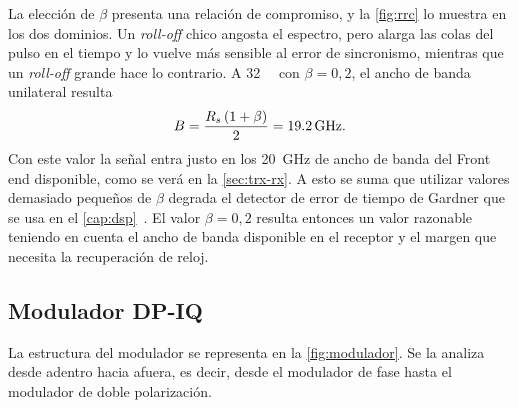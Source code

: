 La elecci\'on de $\beta$ presenta una relaci\'on de compromiso, y la
\cref{fig:rrc} lo muestra en los dos dominios. Un \emph{roll-off} chico
angosta el espectro, pero alarga las colas del pulso en el tiempo y lo vuelve
m\'as sensible al error de sincronismo, mientras que un \emph{roll-off} grande
hace lo contrario. A \SI{32}{\giga\baud} con $\beta = 0{,}2$, el ancho de
banda unilateral resulta
\begin{equation}
  B = \frac{R_{s}\,(1+\beta)}{2} = \SI{19.2}{\giga\hertz}.
  \label{eq:ancho-senal}
\end{equation}
Con este valor la se\~nal entra justo en los \SI{20}{\giga\hertz} de ancho de
banda del Front end disponible, como se ver\'a en la \cref{sec:trx-rx}. A esto se suma que utilizar valores demasiado peque\~nos de $\beta$ degrada el
detector de error de tiempo de Gardner que se usa en el
\cref{cap:dsp}~\cite[p.~182]{mello2021}. El valor $\beta = 0{,}2$ resulta
entonces un valor razonable teniendo en cuenta el ancho de banda disponible en el receptor y el
margen que necesita la recuperaci\'on de reloj.

\subsection{Modulador DP-IQ}
\label{sec:trx-modulador}

La estructura del modulador se representa en la \cref{fig:modulador}. Se 
la analiza desde adentro hacia afuera, es decir, desde el modulador de fase hasta el modulador de doble polarizaci\'on.

